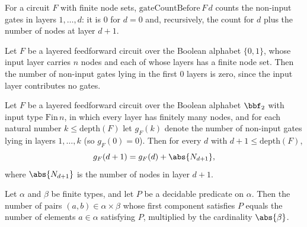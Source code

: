 \begin{definition}
\label{RazborovSmolensky.gateCountBefore}
\leanok
{}
For a circuit $F$ with finite node sets, $\mathrm{gateCountBefore}\,F\,d$ counts the non-input gates
in layers $1,\dots,d$: it is $0$ for $d = 0$ and, recursively, the count for $d$ plus the number of
nodes at layer $d+1$.
\end{definition}

\begin{lemma}
\label{RazborovSmolensky.gateCountBefore_zero}
\leanok
{}
Let $F$ be a layered feedforward circuit over the Boolean alphabet $\{0,1\}$, whose
input layer carries $n$ nodes and each of whose layers has a finite node set. Then the
number of non-input gates lying in the first $0$ layers is zero, since the input layer
contributes no gates.
\end{lemma}

\begin{lemma}
\label{RazborovSmolensky.gateCountBefore_succ}
\leanok
{}
Let $F$ be a layered feedforward circuit over the Boolean alphabet $\bbf_2$ with input
type $\mathrm{Fin}\,n$, in which every layer has finitely many nodes, and for each
natural number $k \le \mathrm{depth}(F)$ let $g_F(k)$ denote the number of non-input
gates lying in layers $1,\dots,k$ (so $g_F(0) = 0$). Then for every $d$ with $d + 1 \le
\mathrm{depth}(F)$, \[ g_F(d+1) = g_F(d) + \abs{N_{d+1}}, \] where $\abs{N_{d+1}}$ is
the number of nodes in layer $d+1$.
\end{lemma}

\begin{lemma}
\label{RazborovSmolensky.prod_left_filter_card}
\leanok
{}
Let $\alpha$ and $\beta$ be finite types, and let $P$ be a decidable predicate on
$\alpha$. Then the number of pairs $(a,b) \in \alpha \times \beta$ whose first component
satisfies $P$ equals the number of elements $a \in \alpha$ satisfying $P$, multiplied by
the cardinality $\abs{\beta}$.
\end{lemma}

